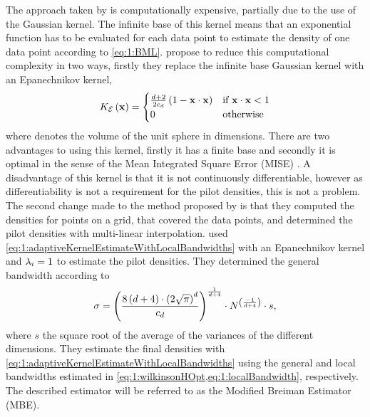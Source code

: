 	The approach taken by \citeauthor{breiman1977variable} is computationally expensive, partially due to the use of the Gaussian kernel. The infinite base of this kernel means that an exponential function has to be evaluated for each data point to estimate the density of one data point according to \cref{eq:1:BML}. \textcite{wilkinson1995dataplot} propose to reduce this computational complexity in two ways, firstly they replace the infinite base Gaussian kernel with an Epanechnikov kernel,
	\begin{equation}
		\varKernel[\varEpan]{\varPattern} = 
		\begin{cases}
			\frac{\varDim + 2}{2\varUnitSphere{\varDim}} \left( 1 - \varPattern \cdot \varPattern \right) & \text{if } \varPattern \cdot \varPattern < 1\\
			0 & \text{otherwise}
		\end{cases}
	\end{equation}
	where \varUnitSphere{\varDim} denotes the volume of the unit sphere in \varDim dimensions. There are two advantages to using this kernel, firstly it has a finite base and secondly it is optimal in the sense of the Mean Integrated Square Error (MISE) \cite{epanechnikov1969non}. A disadvantage of this kernel is that it is not continuously differentiable, however as differentiability is not a requirement for the pilot densities, this is not a problem.
	The second change \textcite{wilkinson1995dataplot} made to the method proposed by \textcite{breiman1977variable} is that they computed the densities for points on a grid, that covered the data points, and determined the pilot densities with multi-linear interpolation. \citeauthor{wilkinson1995dataplot} used \cref{eq:1:adaptiveKernelEstimateWithLocalBandwidths} with an Epanechnikov kernel and $\lambda_{i} = 1$ to estimate the pilot densities. They determined the general bandwidth according to
		\begin{equation}\label{eq:1:wilkinsonHOpt}
			\sigma = \left(\frac{8\left(d + 4\right) \cdot \left(2 \sqrt{\pi}\right)^d}{c_{d}}\right)^{\frac{1}{d + 4}}\cdot N^{\left(\frac{-1}{d +  4}\right)} \cdot s,
		\end{equation}
	where $s$ the square root of the average of the variances of the different dimensions. They estimate the final densities with \cref{eq:1:adaptiveKernelEstimateWithLocalBandwidths} using the general and local bandwidths estimated in \cref{eq:1:wilkinsonHOpt,eq:1:localBandwidth}, respectively. The described estimator will be referred to as the Modified Breiman Estimator (MBE). 


